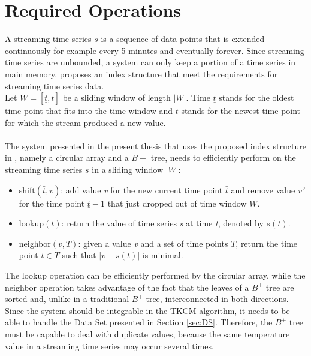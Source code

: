 \documentclass[abstracton,12pt]{scrreprt}
\begin{document}
\section{Required Operations}
\label{sec:Op}
A streaming time series $s$ is a sequence of data points that is extended continuously for example every 5 minutes and eventually forever. Since streaming time series are unbounded, a system can only keep a portion of a time series in main memory. \cite{BScT} proposes an index structure that meet the requirements for streaming time series data.\\
Let $W=[ \underline{t}, \bar{t} ]$ be a sliding window of length $|W|$. Time $\underline{t}$ stands for the oldest time point that fits into the time window and $\bar{t}$ stands for the newest time point for which the stream produced a new value. \\\\
The system presented in the present thesis that uses the proposed index structure in \cite{BScT}, namely a circular array and a $B+$ tree, needs to efficiently perform on the streaming time series $s$ in a sliding window $|W|$: \\
\begin{itemize}  
	\item shift$(\bar{t}, v)$: add value \emph{v} for the new current time point $\bar{t}$ and remove value \emph{v'} for the time point $\underline{t} - 1$ that just dropped out of time window $W$.
	\item lookup$(t)$: return the value of time series \emph{s} at time \emph{t}, denoted by $s(t)$.
	\item neighbor$(v, T)$: given a value \emph{v} and a set of time points $T$, return the time point $t \in T$ such that $|v-s(t)|$ is minimal.\\
\end{itemize}
The lookup operation can be efficiently performed by the circular array, while the neighbor operation takes advantage of the fact that the leaves of a $B^+$ tree are sorted and, unlike in a traditional $B^+$ tree, interconnected in both directions. \\
Since the system should be integrable in the TKCM algorithm, it needs to be able to handle the Data Set presented in Section \ref{sec:DS}. Therefore, the $B^+$ tree must be capable to deal with duplicate values, because the same temperature value in a streaming time series may occur several times. 
\end{document}
